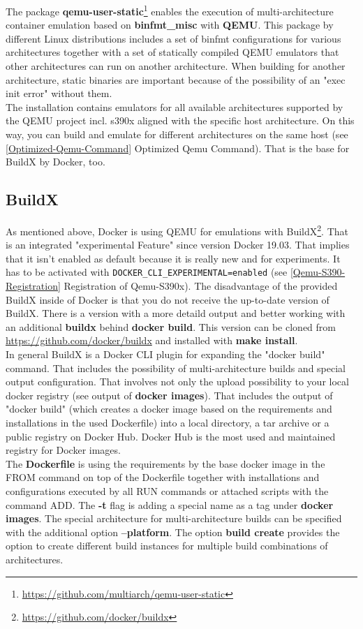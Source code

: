 The package \textbf{qemu-user-static}\footnote{\url{https://github.com/multiarch/qemu-user-static}} enables the execution of multi-architecture container emulation based on \textbf{binfmt\_misc} with \textbf{QEMU}. This package by different Linux distributions includes a set of binfmt configurations for various architectures together with a set of statically compiled QEMU emulators that other architectures can run on another architecture\cite{Yang2019}. When building for another architecture, static binaries are important because of the possibility of an "exec init error" without them. \\
The installation contains emulators for all available architectures supported by the QEMU project incl. s390x aligned with the specific host architecture. On this way, you can build and emulate for different architectures on the same host (see \ref{Optimized-Qemu-Command} Optimized Qemu Command). That is the base for BuildX by Docker, too.

\subsection{BuildX}

As mentioned above, Docker is using QEMU for emulations with BuildX\footnote{\url{https://github.com/docker/buildx}}. That is an integrated "experimental Feature" since version Docker 19.03. That implies that it isn't enabled as default because it is really new and for experiments. It has to be activated with \lstinline!DOCKER_CLI_EXPERIMENTAL=enabled! (see \ref{Qemu-S390-Registration} Registration of Qemu-S390x). The disadvantage of the provided BuildX inside of Docker is that you do not receive the up-to-date version of BuildX. There is a version with a more detaild output and better working with an additional \textbf{buildx} behind \textbf{docker build}. This version can be cloned from \url{https://github.com/docker/buildx} and installed with \textbf{make install}. \\
In general BuildX is a Docker CLI plugin for expanding the "docker build" command. That includes the possibility of multi-architecture builds and special output configuration. That involves not only the upload possibility to your local docker registry (see output of \textbf{docker images}). That includes the output of "docker build" (which creates a docker image based on the requirements and installations in the used Dockerfile) into a local directory, a tar archive or a public registry on Docker Hub. Docker Hub is the most used and maintained registry for Docker images. \\
The \textbf{Dockerfile} is using the requirements by the base docker image in the FROM command on top of the Dockerfile together with installations and configurations executed by all RUN commands or attached scripts with the command ADD. The \textbf{-t} flag is adding a special name as a tag under \textbf{docker images}.
The special architecture for multi-architecture builds can be specified with the additional option \textbf{--platform}.
The option \textbf{build create} provides the option to create different build instances for multiple build combinations of architectures.

